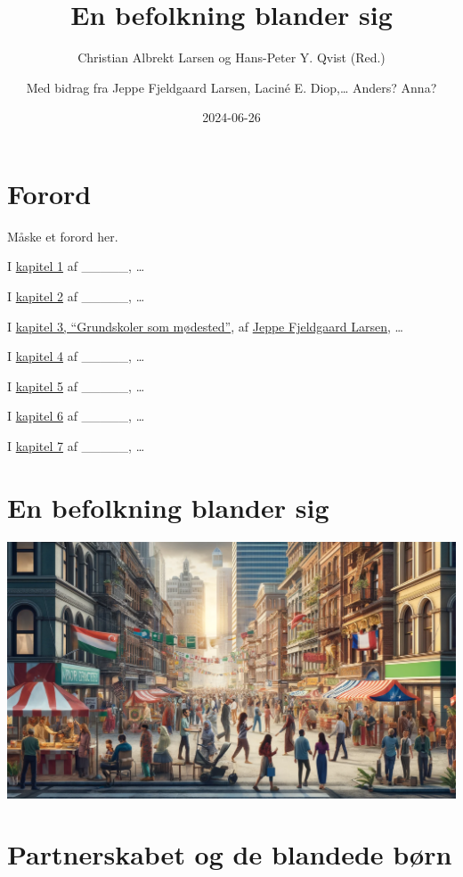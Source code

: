 \documentclass[
]{book}
\title{En befolkning blander sig}
\author{Christian Albrekt Larsen og Hans-Peter Y. Qvist (Red.) \and Med bidrag fra Jeppe Fjeldgaard Larsen, Laciné E. Diop,\ldots{} Anders? Anna?}
\date{2024-06-26}
\begin{document}
\maketitle

{
\setcounter{tocdepth}{1}
\tableofcontents
}
\chapter*{Forord}\label{forord}

Måske et forord her.

I \hyperref[kap1]{kapitel 1} af \_\_\_\_\_, \ldots{}

I \hyperref[kap2]{kapitel 2} af \_\_\_\_\_, \ldots{}

I \hyperref[kap3]{kapitel 3, ``Grundskoler som mødested''}, af \href{https://vbn.aau.dk/da/persons/140717}{Jeppe Fjeldgaard Larsen}, \ldots{}

I \hyperref[kap4]{kapitel 4} af \_\_\_\_\_, \ldots{}

I \hyperref[kap5]{kapitel 5} af \_\_\_\_\_, \ldots{}

I \hyperref[kap6]{kapitel 6} af \_\_\_\_\_, \ldots{}

I \hyperref[kap7]{kapitel 7} af \_\_\_\_\_, \ldots{}

\chapter{En befolkning blander sig}\label{kap1}

\includegraphics[width=1\linewidth]{images/dalle-smeltedige}

\chapter{Partnerskabet og de blandede børn}\label{kap2}
\end{document}
